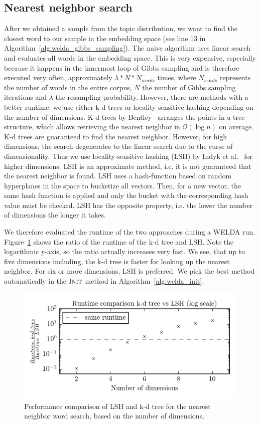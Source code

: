 \documentclass[
        a4paper,
        titlepage,
        twoside,
        parskip,
        numbers=noenddot
        ]{scrbook}
\theoremstyle{break}
\begin{document}
\subsection{Nearest neighbor search}
After we obtained a sample from the topic distribution, we want to find the closest word to our sample in the embedding space (see line 13 in Algorithm~\ref{alg:welda_gibbs_sampling}).
The naive algorithm uses linear search and evaluates all words in the embedding space.
This is very expensive, especially because it happens in the innermost loop of Gibbs sampling and is therefore executed very often, approximately $\lambda * N * N_{words}$ times, where $N_{words}$ represents the number of words in the entire corpus, $N$ the number of Gibbs sampling iterations and   $\lambda$ the resampling probability.
However, there are methods with a better runtime: we use either k-d trees or locality-sensitive hashing depending on the number of dimensions.
K-d trees by Bentley~\cite{Bentley1975} arranges the points in a tree structure, which allows retrieving the nearest neighbor in $\mathcal{O}(\log n)$ on average.
K-d trees are guaranteed to find the nearest neighbor.
However, for high dimensions, the search degenerates to the linear search due to the curse of dimensionality.
Thus we use locality-sensitive hashing (LSH) by Indyk et al.~\cite{Indyk1998} for higher dimensions.
LSH is an approximate method, i.e. it is not guaranteed that the nearest neighbor is found.
LSH uses a hash-function based on random hyperplanes in the space to bucketize all vectors.
Then, for a new vector, the same hash function is applied and only the bucket with the corresponding hash value must be checked.
LSH has the opposite property, i.e. the lower the number of dimensions the longer it takes.

We therefore evaluated the runtime of the two approaches during a WELDA run.
Figure~\ref{fig:lsh_vs_kdtree} shows the ratio of the runtime of the k-d tree and LSH.
Note the logarithmic y-axis, so the ratio actually increases very fast.
We see, that up to five dimensions including, the k-d tree is faster for looking up the nearest neighbor.
For six or more dimensions, LSH is preferred.
We pick the best method automatically in the $\textsc{Init}$ method in Algorithm~\ref{alg:welda_init}.
\begin{figure}
       \centering
       \includegraphics[width=12cm]{figures/lsh_vs_kdtree.png}
       \caption{Performance comparison of LSH and k-d tree for the nearest neighbor word search, based on the number of dimensions.}
       \label{fig:lsh_vs_kdtree}
\end{figure}
\end{document}

